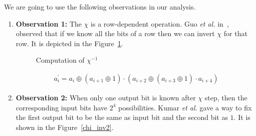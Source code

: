 \documentclass[runningheads]{llncs}
\newcommand{\etal}{\textit{et al. }}
\begin{document}
We are going to use the following observations in our analysis.
\begin{enumerate}
\item \label{ob1}\textbf{Observation 1:} The $\chi$ is a row-dependent operation. Guo \etal in~\cite{guo2016linear}, observed that if we know all the bits of a row then we can invert $\chi$ for that row. It is depicted in the Figure~\ref{chi_inv}.
\begin{figure}
\begin{center}
\end{center}
\caption{Computation of $\chi^{-1}$\label{chi_inv}}
\end{figure}
\begin{align}
a_i^\prime = a_i \oplus \left( a_{i+1} \oplus 1\right) \cdot \left( a_{i+2} \oplus \left( a_{i+3} \oplus 1 \right) \cdot a_{i+4}\right)
\end{align}


\item \label{ob2}\textbf{Observation 2:} When only one output bit is known after $\chi$ step, then the corresponding input bits have $2^4$ possibilities. Kumar \etal\cite{kumar2018cryptanalysis} gave a way to fix the first output bit to be the same as input bit and the second bit as $1$. It is shown in the Figure~\ref{chi_inv2}.

\begin{figure}[ht]
\begin{center}
\end{center}
\end{figure}
\end{enumerate}
\end{document}

